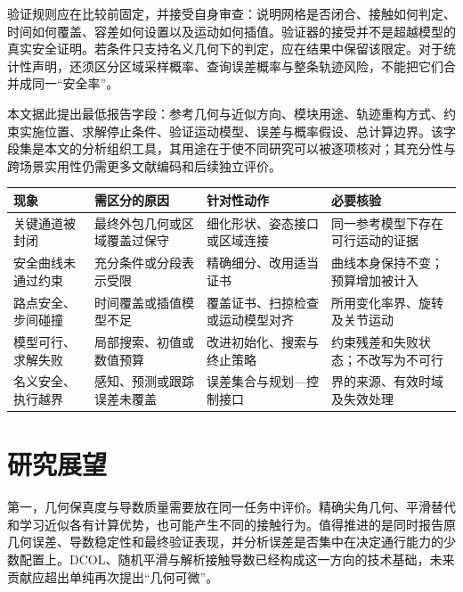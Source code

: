 \documentclass{aas}
\begin{document}
验证规则应在比较前固定，并接受自身审查：说明网格是否闭合、接触如何判定、时间如何覆盖、容差如何设置以及运动如何插值。验证器的接受并不是超越模型的真实安全证明。若条件只支持名义几何下的判定，应在结果中保留该限定。对于统计性声明，还须区分区域采样概率、查询误差概率与整条轨迹风险，不能把它们合并成同一“安全率”。

本文据此提出最低报告字段：参考几何与近似方向、模块用途、轨迹重构方式、约束实施位置、求解停止条件、验证运动模型、误差与概率假设、总计算边界。该字段集是本文的分析组织工具，其用途在于使不同研究可以被逐项核对；其充分性与跨场景实用性仍需更多文献编码和后续独立评价。

\begin{table}[t]
\centering
{}
\small\setlength{\tabcolsep}{3pt}
\begin{tabular}{>{\raggedright\arraybackslash}p{}>{\raggedright\arraybackslash}p{}>{\raggedright\arraybackslash}p{}>{\raggedright\arraybackslash}p{}}
\toprule
现象 & 需区分的原因 & 针对性动作 & 必要核验\\
\midrule
关键通道被封闭 & 最终外包几何或区域覆盖过保守 & 细化形状、姿态接口或区域连接 & 同一参考模型下存在可行运动的证据\\
安全曲线未通过约束 & 充分条件或分段表示受限 & 精确细分、改用适当证书 & 曲线本身保持不变；预算增加被计入\\
路点安全、步间碰撞 & 时间覆盖或插值模型不足 & 覆盖证书、扫掠检查或运动模型对齐 & 所用变化率界、旋转及关节运动\\
模型可行、求解失败 & 局部搜索、初值或数值预算 & 改进初始化、搜索与终止策略 & 约束残差和失败状态；不改写为不可行\\
名义安全、执行越界 & 感知、预测或跟踪误差未覆盖 & 误差集合与规划---控制接口 & 界的来源、有效时域及失效处理\\
\bottomrule
\end{tabular}
\end{table}
\section{研究展望}
第一，几何保真度与导数质量需要放在同一任务中评价。精确尖角几何、平滑替代和学习近似各有计算优势，也可能产生不同的接触行为。值得推进的是同时报告原几何误差、导数稳定性和最终验证表现，并分析误差是否集中在决定通行能力的少数配置上。DCOL、随机平滑与解析接触导数已经构成这一方向的技术基础，未来贡献应超出单纯再次提出“几何可微”。\cite{R05}\cite{R06}\cite{R16}
\end{document}
